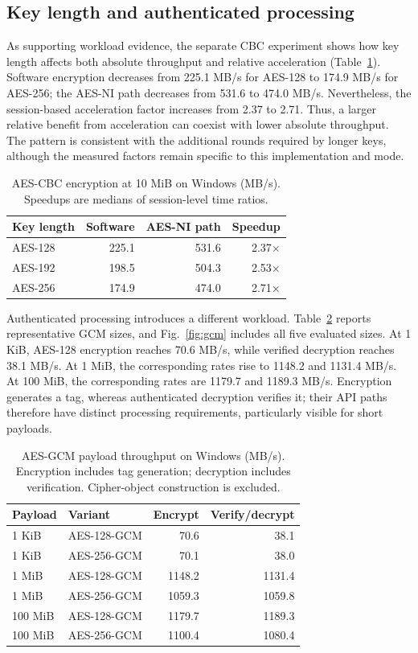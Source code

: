 \subsection{Key length and authenticated processing}
As supporting workload evidence, the separate CBC experiment shows how key length affects both absolute throughput and relative acceleration (Table~\ref{tab:cbc}). Software encryption decreases from 225.1 MB/s for AES-128 to 174.9 MB/s for AES-256; the AES-NI path decreases from 531.6 to 474.0 MB/s. Nevertheless, the session-based acceleration factor increases from 2.37 to 2.71. Thus, a larger relative benefit from acceleration can coexist with lower absolute throughput. The pattern is consistent with the additional rounds required by longer keys, although the measured factors remain specific to this implementation and mode.

\begin{table}[htbp]\centering\caption{AES-CBC encryption at 10 MiB on Windows (MB/s). Speedups are medians of session-level time ratios.}\label{tab:cbc}
\begin{tabular}{lrrr}\toprule Key length & Software & AES-NI path & Speedup\\\midrule
AES-128 & 225.1 & 531.6 & 2.37$\times$\\
AES-192 & 198.5 & 504.3 & 2.53$\times$\\
AES-256 & 174.9 & 474.0 & 2.71$\times$\\\bottomrule\end{tabular}\end{table}

Authenticated processing introduces a different workload. Table~\ref{tab:gcm} reports representative GCM sizes, and Fig.~\ref{fig:gcm} includes all five evaluated sizes. At 1 KiB, AES-128 encryption reaches 70.6 MB/s, while verified decryption reaches 38.1 MB/s. At 1 MiB, the corresponding rates rise to 1148.2 and 1131.4 MB/s. At 100 MiB, the corresponding rates are 1179.7 and 1189.3 MB/s. Encryption generates a tag, whereas authenticated decryption verifies it; their API paths therefore have distinct processing requirements, particularly visible for short payloads.

\begin{table}[htbp]\centering\caption{AES-GCM payload throughput on Windows (MB/s). Encryption includes tag generation; decryption includes verification. Cipher-object construction is excluded.}\label{tab:gcm}\small
\begin{tabular}{llrr}\toprule Payload & Variant & Encrypt & Verify/decrypt\\\midrule
1 KiB & AES-128-GCM & 70.6 & 38.1\\
1 KiB & AES-256-GCM & 70.1 & 38.0\\
1 MiB & AES-128-GCM & 1148.2 & 1131.4\\
1 MiB & AES-256-GCM & 1059.3 & 1059.8\\
100 MiB & AES-128-GCM & 1179.7 & 1189.3\\
100 MiB & AES-256-GCM & 1100.4 & 1080.4\\\bottomrule\end{tabular}\end{table}

